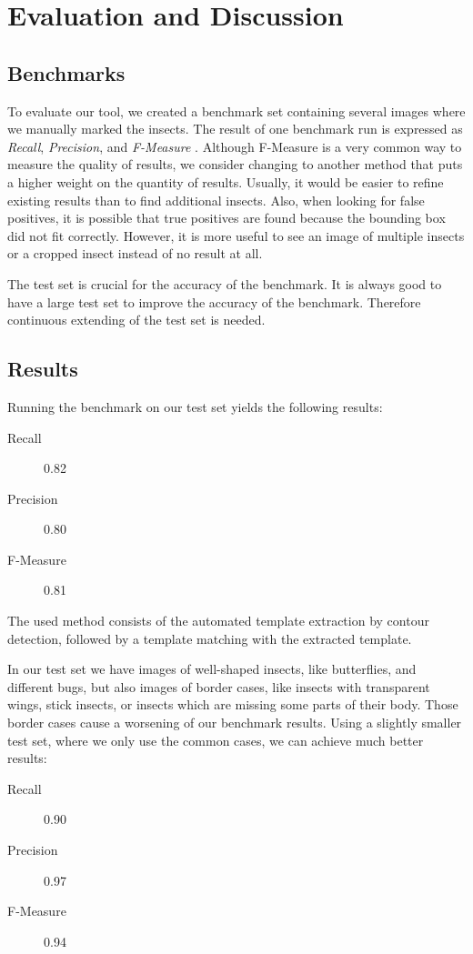 %
\section{Evaluation and Discussion}
\label{sec_eval}
\label{sec_conclusion}

\subsection{Benchmarks}
To evaluate our tool, we created a benchmark set containing several images where we manually marked the insects.
The result of one benchmark run is expressed as \textit{Recall}, \textit{Precision}, and \textit{F-Measure} \cite{f_measure}.
Although F-Measure is a very common way to measure the quality of results, we consider changing  to another method that puts a higher weight on the quantity of results. 
Usually, it would be easier to refine existing results than to find additional insects. 
Also, when looking for false positives, it is possible that true positives are found because the bounding box did not fit correctly.
However, it is more useful to see an image of multiple insects or a cropped insect instead of no result at all.

The test set is crucial for the accuracy of the benchmark. 
It is always good to have a large test set to improve the accuracy of the benchmark.
Therefore continuous extending of the test set is needed. 

\subsection{Results}

Running the benchmark on our test set yields the following results:
%
\begin{description}
	\item[Recall] 0.82
	\item[Precision] 0.80
	\item[F-Measure] 0.81
\end{description}
%
The used method consists of the automated template extraction by contour detection, followed by a template matching with the extracted template.

In our test set we have images of well-shaped insects, like butterflies, and different bugs,
but also images of border cases, like insects with transparent wings, stick insects, or insects which are missing some parts of their body.
Those border cases cause a worsening of our benchmark results.
Using a slightly smaller test set, where we only use the common cases, we can achieve much better results:
%
\begin{description}
	\item[Recall] 0.90
	\item[Precision] 0.97
	\item[F-Measure] 0.94
\end{description}
%

